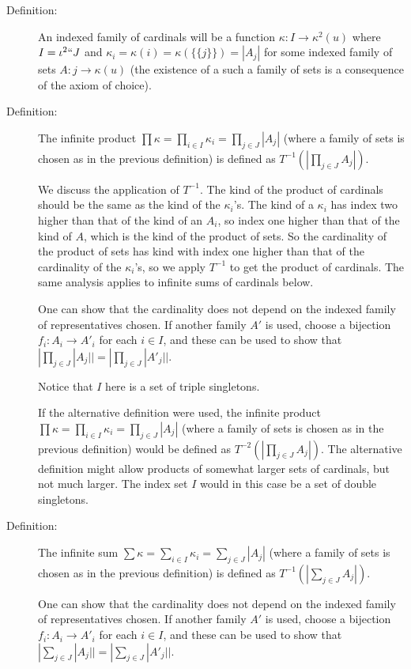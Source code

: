 \documentclass[12pt]{article}
\begin{document}
\begin{description}

\item[Definition:]  An indexed family of cardinals will be a function $\kappa:I \rightarrow \kappa^2(u)$ where $I = \iota^2``J$ and $\kappa_i = \kappa(i) = \kappa(\{\{j\}\}) = |A_j|$ for some indexed family
of sets $A:j \rightarrow \kappa(u)$ (the existence of a such a family of sets is a consequence of the axiom of choice).

\item[Definition:]  The infinite product $\prod \kappa = \prod_{i\in I}\kappa_i = \prod_{j \in J} |A_j|$ (where a family of sets is chosen as in the previous definition) is defined as $T^{-1}(|\prod_{j\in J} A_j|)$.

We discuss the application of $T^{-1}$.  The kind of the product of cardinals should be the same as the kind of the $\kappa_i$'s.  The kind of a $\kappa_i$ has index two higher than that of the kind of an $A_i$, so index one higher than that of the kind of $A$, which is the kind of the product of sets.  So the cardinality of the product of sets has kind with index one higher than that of the cardinality of the $\kappa_i$'s, so we apply $T^{-1}$ to get the product of cardinals.  The same analysis applies to infinite sums of cardinals below.

One can show that the cardinality does not depend on the indexed family of representatives chosen.  If another family $A'$ is used, choose a bijection $f_i:A_i \rightarrow A'_i$ for each $i \in I$, and these can be used to show that 
$|\prod_{j \in J} |A_j||=|\prod_{j \in J} |A'_j||$.

Notice that $I$ here is a set of triple singletons.

If the alternative definition were used, the infinite product $\prod \kappa = \prod_{i\in I}\kappa_i = \prod_{j \in J} |A_j|$ (where a family of sets is chosen as in the previous definition) would be defined as $T^{-2}(|\prod_{j\in J} A_j|)$.  The alternative definition might allow products of somewhat larger sets of cardinals, but not much larger.   The index set $I$ would in this case be a set of double singletons.

\item[Definition:]  The infinite sum $\sum \kappa = \sum_{i\in I}\kappa_i = \sum_{j \in J} |A_j|$ (where a family of sets is chosen as in the previous definition) is defined as $T^{-1}(|\sum_{j\in J} A_j|)$.

One can show that the cardinality does not depend on the indexed family of representatives chosen.  If another family $A'$ is used, choose a bijection $f_i:A_i \rightarrow A'_i$ for each $i \in I$, and these can be used to show that 
$|\sum_{j \in J} |A_j||=|\sum_{j \in J} |A'_j||$.


\end{description}
\end{document}
